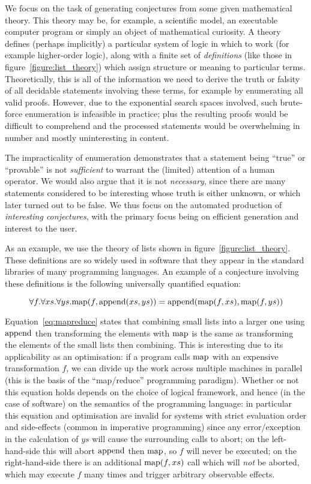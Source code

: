 We focus on the task of generating conjectures from some given mathematical
theory. This theory may be, for example, a scientific model, an executable
computer program or simply an object of mathematical curiosity. A theory
defines (perhaps implicitly) a particular system of logic in which to work (for
example higher-order logic), along with a finite set of \emph{definitions} (like
those in figure~\ref{figure:list_theory}) which assign structure or meaning to
particular terms. Theoretically, this is all of the information we need to
derive the truth or falsity of all decidable statements involving these terms,
for example by enumerating all valid proofs. However, due to the exponential
search spaces involved, such brute-force enumeration is infeasible in practice;
plus the resulting proofs would be difficult to comprehend and the processed
statements would be overwhelming in number and mostly uninteresting in content.

The impracticality of enumeration demonstrates that a statement being ``true''
or ``provable'' is not \emph{sufficient} to warrant the (limited) attention of a
human operator. We would also argue that it is not \emph{necessary}, since there
are many statements considered to be interesting whose truth is either unknown,
or which later turned out to be false. We thus focus on the automated production
of \emph{interesting conjectures}, with the primary focus being on efficient
generation and interest to the user.

As an example, we use the theory of lists shown in
figure~\ref{figure:list_theory}. These definitions are so widely used in
software that they appear in the standard libraries of many programming
languages. An example of a conjecture involving these definitions is the
following universally quantified equation:

\begin{equation} \label{eq:mapreduce}
  \forall f. \forall xs. \forall ys.
    \text{map}(f, \text{append}(xs, ys)) = \text{append}(\text{map}(f, xs), \text{map}(f, ys))
\end{equation}

Equation~\ref{eq:mapreduce} states that combining small lists into a larger one
using $\text{append}$ then transforming the elements with $\text{map}$ is the same as
transforming the elements of the small lists then combining. This is interesting
due to its applicability as an optimisation: if a program calls $\text{map}$ with an
expensive transformation $f$, we can divide up the work across multiple machines
in parallel (this is the basis of the ``map/reduce'' programming paradigm).
Whether or not this equation holds depends on the choice of logical framework,
and hence (in the case of software) on the semantics of the programming
language: in particular this equation and optimisation are invalid for systems
with strict evaluation order and side-effects (common in imperative programming)
since any error/exception in the calculation of $ys$ will cause the surrounding
calls to abort; on the left-hand-side this will abort $\text{append}$ then $\text{map}$, so
$f$ will never be executed; on the right-hand-side there is an additional
$\text{map}(f, xs)$ call which will \emph{not} be aborted, which may execute $f$ many
times and trigger arbitrary observable effects.
